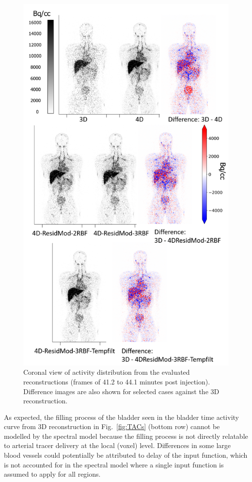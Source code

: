 \begin{figure} [!ht]
\centering
\includegraphics[scale=1.12, angle=0]{3_Results/3_4_Residual/figures/Frame14DifferencesV2.png}
\caption{Coronal view of activity distribution from the evaluated reconstructions (frames of 41.2 to 44.1 minutes post injection). Difference images are also shown for selected cases against the 3D reconstruction.}
\label{fig:Frame14Differences}
\end{figure}

As expected, the filling process of the bladder seen in the bladder time activity curve from 3D reconstruction in Fig.~\ref{fig:TACs} (bottom row) cannot be modelled by the spectral model because the filling process is not directly relatable to arterial tracer delivery at the local (voxel) level. Differences in some large blood vessels could potentially be attributed to delay of the input function, which is not accounted for in the spectral model where a single input function is assumed to apply for all regions. 

